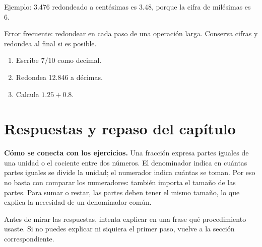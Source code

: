 \documentclass[10pt,oneside,openany]{book}
\begin{document}
\begin{ejemplo}
Ejemplo: 3.476 redondeado a centésimas es 3.48, porque la cifra de milésimas es 6.
\end{ejemplo}

\begin{ojo}
Error frecuente: redondear en cada paso de una operación larga. Conserva cifras y redondea al final si es posible.
\end{ojo}

\begin{practica}

\begin{enumerate}

\item Escribe $7/10$ como decimal.

\item Redondea 12.846 a décimas.

\item Calcula $1.25+0.8$.

\end{enumerate}

\end{practica}



\section{Respuestas y repaso del capítulo}

\textbf{Cómo se conecta con los ejercicios.} Una fracción expresa partes iguales de una unidad o el cociente entre dos números. El denominador indica en cuántas partes iguales se divide la unidad; el numerador indica cuántas se toman. Por eso no basta con comparar los numeradores: también importa el tamaño de las partes. Para sumar o restar, las partes deben tener el mismo tamaño, lo que explica la necesidad de un denominador común.

Antes de mirar las respuestas, intenta explicar en una frase qué procedimiento usaste. Si no puedes explicar ni siquiera el primer paso, vuelve a la sección correspondiente.
\end{document}
